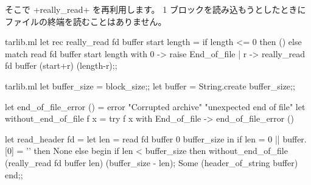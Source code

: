 そこで \ml+really_read+ を再利用します。
1 ブロックを読み込もうとしたときにファイルの終端を読むことはありません。
%
\begin{codefile}{tarlib.ml}
let rec really_read fd buffer start length =
  if length <= 0 then () else
    match read fd buffer start length with
      0 -> raise End_of_file
    | r -> really_read fd buffer (start+r) (length-r);;
\end{codefile}
%
\begin{listingcodefile}{tarlib.ml}
let buffer_size = block_size;;
let buffer = String.create buffer_size;;

let end_of_file_error () =
  error "Corrupted archive" "unexpected end of file"
let without_end_of_file f x =
  try f x with End_of_file -> end_of_file_error ()

let read_header fd =
  let len = read fd buffer 0 buffer_size in
  if len = 0 ||  buffer.[0] = '' then None
  else begin
    if len < buffer_size then
      without_end_of_file (really_read fd buffer len) (buffer_size - len);
    Some (header_of_string buffer)
  end;;
\end{listingcodefile}

